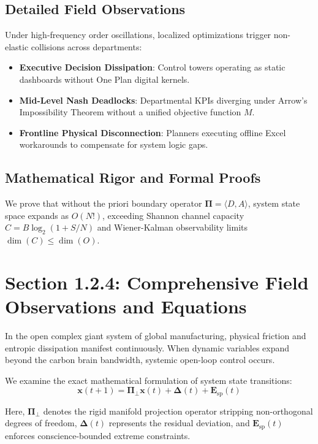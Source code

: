 \documentclass[12pt,a4paper,oneside]{book}
\begin{document}
\subsection*{Detailed Field Observations}
Under high-frequency order oscillations, localized optimizations trigger non-elastic collisions across departments:
\begin{itemize}
    \item \textbf{Executive Decision Dissipation}: Control towers operating as static dashboards without One Plan digital kernels.
    \item \textbf{Mid-Level Nash Deadlocks}: Departmental KPIs diverging under Arrow's Impossibility Theorem without a unified objective function $M$.
    \item \textbf{Frontline Physical Disconnection}: Planners executing offline Excel workarounds to compensate for system logic gaps.
\end{itemize}

\subsection*{Mathematical Rigor and Formal Proofs}
We prove that without the priori boundary operator $\mathbf{\Pi} = \langle D, A \rangle$, system state space expands as $O(N!)$, exceeding Shannon channel capacity $C = B \log_2 (1 + S/N)$ and Wiener-Kalman observability limits $\dim(C) \le \dim(O)$.
\clearpage
\section{Section 1.2.4: Comprehensive Field Observations and Equations}

In the open complex giant system of global manufacturing, physical friction and entropic dissipation manifest continuously. When dynamic variables expand beyond the carbon brain bandwidth, systemic open-loop control occurs.

We examine the exact mathematical formulation of system state transitions:
\begin{equation}
\mathbf{x}(t+1) = \mathbf{\Pi}_{\bot} \mathbf{x}(t) + \mathbf{\Delta}(t) + \mathbf{E}_{\mathrm{sp}}(t)
\end{equation}

Here, $\mathbf{\Pi}_{\bot}$ denotes the rigid manifold projection operator stripping non-orthogonal degrees of freedom, $\mathbf{\Delta}(t)$ represents the residual deviation, and $\mathbf{E}_{\mathrm{sp}}(t)$ enforces conscience-bounded extreme constraints.
\end{document}
